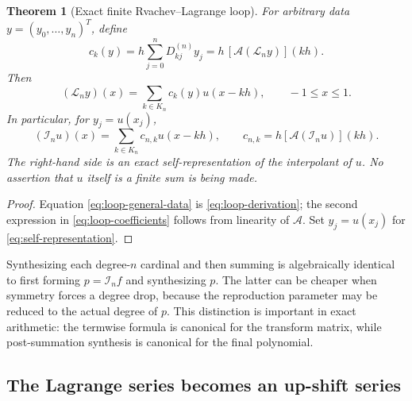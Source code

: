 \documentclass[11pt,oneside]{article}
\numberwithin{equation}{section}
\newtheorem{theorem}{Theorem}[section]
\theoremstyle{definition}
\theoremstyle{remark}
\newcommand{\App}{\mathscr A}
\newcommand{\Lag}{\mathcal I}
\newcommand{\Rec}{\mathcal L}
\begin{document}
\begin{theorem}[Exact finite Rvachev--Lagrange loop]
\label{thm:loop}
For arbitrary data $y=(y_0,\ldots,y_n)^T$, define
\begin{equation}
 c_k(y)=h\sum_{j=0}^{n}D_{kj}^{(n)}y_j
 =h\,[\App(\Rec_ny)](kh).
 \label{eq:loop-coefficients}
\end{equation}
Then
\begin{equation}
 \boxed{
 (\Rec_ny)(x)=\sum_{k\in K_n}c_k(y)u(x-kh),
 \qquad -1\le x\le1.
 }
 \label{eq:loop-general-data}
\end{equation}
In particular, for $y_j=u(x_j)$,
\begin{equation}
 \boxed{
 (\Lag_nu)(x)=\sum_{k\in K_n}c_{n,k}u(x-kh),
 \qquad
 c_{n,k}=h[\App(\Lag_nu)](kh).
 }
 \label{eq:self-representation}
\end{equation}
The right-hand side is an exact self-representation of the
\emph{interpolant} of $u$.  No assertion that $u$ itself is a finite sum is
being made.
\end{theorem}

\begin{proof}
Equation \eqref{eq:loop-general-data} is
\eqref{eq:loop-derivation}; the second expression in
\eqref{eq:loop-coefficients} follows from linearity of $\App$.  Set
$y_j=u(x_j)$ for \eqref{eq:self-representation}.
\end{proof}

\begin{remark}
Synthesizing each degree-$n$ cardinal and then summing is algebraically
identical to first forming $p=\Lag_nf$ and synthesizing $p$.  The latter can
be cheaper when symmetry forces a degree drop, because the reproduction
parameter may be reduced to the actual degree of $p$.  This distinction is
important in exact arithmetic: the termwise formula is canonical for the
transform matrix, while post-summation synthesis is canonical for the final
polynomial.
\end{remark}

\subsection{The Lagrange series becomes an up-shift series}
\end{document}
